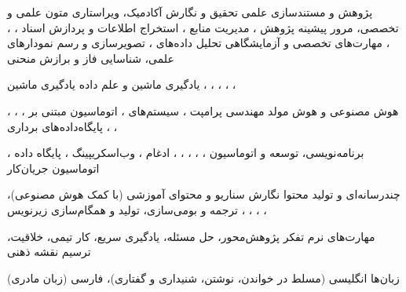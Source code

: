 


\begin{cvskills}
	
	
	\cvskill
	{پژوهش و مستندسازی علمی}
	{\setlength{\baselineskip}{1.5em} تحقیق و نگارش آکادمیک، ویراستاری متون علمی و تخصصی، مرور پیشینه پژوهش ، مدیریت منابع ، استخراج اطلاعات و پردازش اسناد ، ، ،  \vspace{2mm}}
	\cvskill
	{مهارت‌های تخصصی و آزمایشگاهی}
	{\setlength{\baselineskip}{1.5em} تحلیل داده‌های  ، تصویرسازی و رسم نمودارهای علمی،  شناسایی فاز و برازش منحنی  \vspace{2mm}}
	
	\cvskill
	{یادگیری ماشین و علم داده}
	{\setlength{\baselineskip}{1.5em} یادگیری ماشین ، ، ، ، ،  \vspace{2mm}}
	
	\cvskill
	{هوش مصنوعی و هوش مولد}
	{\setlength{\baselineskip}{1.5em} مهندسی پرامپت ، سیستم‌های ، اتوماسیون مبتنی بر ، ، ، پایگاه‌داده‌های برداری ، ،  \vspace{2mm}}
	
	\cvskill
	{برنامه‌نویسی، توسعه و اتوماسیون}
	{\setlength{\baselineskip}{1.5em} ، ، ، ، ، ادغام ، وب‌اسکریپینگ ، پایگاه داده ، اتوماسیون جریان‌کار  \vspace{2mm}}
	
	\cvskill
	{چندرسانه‌ای و تولید محتوا}
	{\setlength{\baselineskip}{1.5em} نگارش سناریو و محتوای آموزشی (با کمک هوش مصنوعی)، ترجمه و بومی‌سازی، تولید و همگام‌سازی زیرنویس ، ، ، ،  \vspace{2mm}}
	
	\cvskill
	{مهارت‌های نرم}
	{\setlength{\baselineskip}{1.5em} تفکر پژوهش‌محور، حل مسئله، یادگیری سریع، کار تیمی، خلاقیت، ترسیم نقشه ذهنی  \vspace{2mm}}
	
	\cvskill
	{زبان‌ها}
	{\setlength{\baselineskip}{1.5em} انگلیسی (مسلط در خواندن، نوشتن، شنیداری و گفتاری)، فارسی (زبان مادری)}
	
\end{cvskills}

